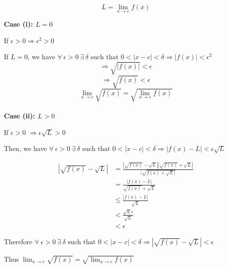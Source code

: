 \documentclass{article}
\begin{document}
\[
L = \lim_{x\to c}{f(x)}
\]

\textbf{Case (i): \(L = 0\)}

If \(\epsilon > 0 \Rightarrow \epsilon^2 > 0 \)

If \(L=0\), we have \(\forall \ \epsilon > 0 \ \exists \ \delta \text{ such that } 0 < |x-c| < \delta \Rightarrow |f(x)| < \epsilon^2\)
\[
\Rightarrow \sqrt{|f(x)|} < \epsilon 
\]
\[
\Rightarrow \sqrt{f(x)} < \epsilon 
\]
\[
\lim_{x\to c}{\sqrt{f(x)}} = \sqrt{\lim_{x\to c}{f(x)}}
\]
\\

\textbf{Case (ii): \(L > 0\)}

If \(\epsilon > 0 \) \(\Rightarrow \epsilon \sqrt{L}  > 0\)

Then, we have \(\forall \ \epsilon > 0 \ \exists \ \delta \text{ such that } 0 < |x-c| < \delta \Rightarrow |f(x)- L| < \epsilon \sqrt{L} \)


\begin{align*}
    |\sqrt{f(x)} - \sqrt{L}| &= \frac{|\sqrt{f(x)} - \sqrt{L}||\sqrt{f(x)} + \sqrt{L}|}{|\sqrt{f(x) + \sqrt{L}|}} \\
    &= \frac{|f(x) - L|}{\sqrt{f(x)} + \sqrt{L}} \\
    &\leq \frac{|f(x)-L|}{\sqrt{L}} \\
    &< \frac{\sqrt{L} \epsilon }{\sqrt{L}} \\
    &< \epsilon 
\end{align*}

Therefore \(\forall \ \epsilon > 0 \ \exists \ \delta \text{ such that } 0 < |x-c| < \delta \Rightarrow |\sqrt{f(x)}- \sqrt{L}| < \epsilon \)

Thus \(\lim_{x\to c}{\sqrt{f(x)}} = \sqrt{\lim_{x\to c}{f(x)}}\)
\end{document}
